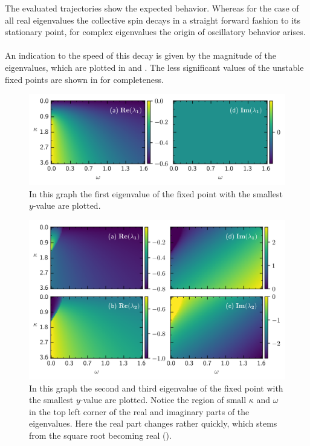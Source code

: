 The evaluated trajectories show the expected behavior. Whereas for the case of all real eigenvalues the collective spin decays in a straight forward fashion to its stationary point, for complex eigenvalues the origin of oscillatory behavior arises. %
\\\\An indication to the speed of this decay is given by the magnitude of the eigenvalues, which are plotted in  and . The less significant values of the unstable fixed points are shown in  for completeness.

\begin{figure}[H]
    \centering
    \includegraphics{pictures/lam_anal_s_1.png}
    \caption{In this graph the first eigenvalue of the fixed point with the smallest $y$-value are plotted.}
    \label{fig:eig_value_stab1}
\end{figure}
\begin{figure}[H]
    \centering
    \includegraphics{pictures/lam_anal_s_2.png}
    \caption{In this graph the second and third eigenvalue of the fixed point with the smallest $y$-value are plotted. Notice the region of small $\kappa$ and $\omega$ in the top left corner of the real and imaginary parts of the eigenvalues. Here the real part changes rather quickly, which stems from the square root becoming real ().
    }
    \label{fig:eig_value_stab2}
\end{figure}

